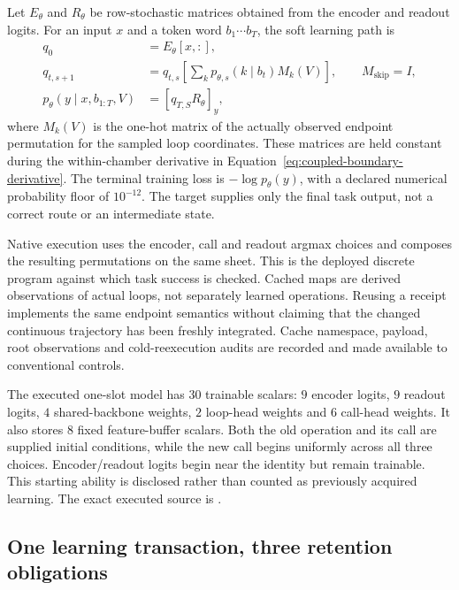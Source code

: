 Let $E_\theta$ and $R_\theta$ be row-stochastic matrices obtained from the
encoder and readout logits. For an input $x$ and a token word
$b_1\cdots b_T$, the soft learning path is
\begin{align}
 q_0&=E_\theta[x,:],\\
 q_{t,s+1}
   &=q_{t,s}\left[\sum_k p_{\theta,s}(k\mid b_t)M_k(V)\right],
       \qquad M_{\mathrm{skip}}=I,\\
 p_\theta(y\mid x,b_{1:T},V)&=[q_{T,S}R_\theta]_y,
 \label{eq:block-soft-execution}
\end{align}
where $M_k(V)$ is the one-hot matrix of the actually observed endpoint
permutation for the sampled loop coordinates. These matrices are held
constant during the within-chamber derivative in
Equation~\eqref{eq:coupled-boundary-derivative}. The terminal training loss is
$-\log p_\theta(y)$, with a declared numerical probability floor of
$10^{-12}$. The target supplies only the final task output, not a correct
route or an intermediate state.

Native execution uses the encoder, call and readout argmax choices and
composes the resulting permutations on the same sheet. This is the deployed
discrete program against which task success is checked. Cached maps are
derived observations of actual loops, not separately learned operations.
Reusing a receipt implements the same endpoint semantics without claiming
that the changed continuous trajectory has been freshly integrated. Cache
namespace, payload, root observations and cold-reexecution audits are
recorded and made available to conventional controls.

The executed one-slot model has $30$ trainable scalars:
$9$ encoder logits, $9$ readout logits, $4$ shared-backbone weights,
$2$ loop-head weights and $6$ call-head weights. It also stores $8$ fixed
feature-buffer scalars. Both the old operation and its call are supplied
initial conditions, while the new call begins uniformly across all three
choices. Encoder/readout logits begin near the identity but remain
trainable. This starting ability is disclosed rather than counted as
previously acquired learning. The exact executed source is
.

\subsection{One learning transaction, three retention obligations}

